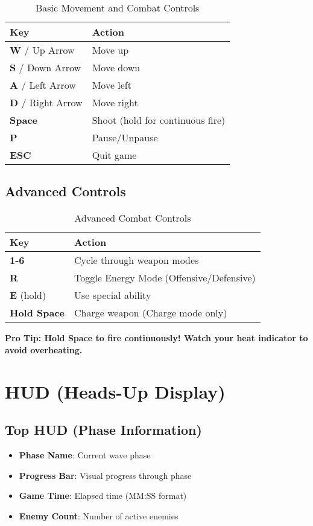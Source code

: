 \documentclass[11pt,a4paper]{article}
\newcommand{\infobox}[2]{%
    \vspace{0.3cm}
    \noindent\colorbox{#1!10}{%
        \parbox{\dimexpr\textwidth-2\fboxsep}{%
            \textcolor{#1}{\textbf{#2}}
        }
    }
    \vspace{0.3cm}
}
\begin{document}
\begin{table}[h]
\centering
\begin{tabularx}{\textwidth}{|l|X|}
\hline
\rowcolor{primarycolor!20}
\textbf{Key} & \textbf{Action} \\
\hline
\textbf{W} / Up Arrow & Move up \\
\hline
\textbf{S} / Down Arrow & Move down \\
\hline
\textbf{A} / Left Arrow & Move left \\
\hline
\textbf{D} / Right Arrow & Move right \\
\hline
\textbf{Space} & Shoot (hold for continuous fire) \\
\hline
\textbf{P} & Pause/Unpause \\
\hline
\textbf{ESC} & Quit game \\
\hline
\end{tabularx}
\caption{Basic Movement and Combat Controls}
\end{table}

\subsection{Advanced Controls}

\begin{table}[h]
\centering
\begin{tabularx}{\textwidth}{|l|X|}
\hline
\rowcolor{primarycolor!20}
\textbf{Key} & \textbf{Action} \\
\hline
\textbf{1-6} & Cycle through weapon modes \\
\hline
\textbf{R} & Toggle Energy Mode (Offensive/Defensive) \\
\hline
\textbf{E} (hold) & Use special ability \\
\hline
\textbf{Hold Space} & Charge weapon (Charge mode only) \\
\hline
\end{tabularx}
\caption{Advanced Combat Controls}
\end{table}

\infobox{infocolor}{\textbf{Pro Tip:} Hold Space to fire continuously! Watch your heat indicator to avoid overheating.}

\section{HUD (Heads-Up Display)}

\subsection{Top HUD (Phase Information)}
\begin{itemize}
    \item \textbf{Phase Name}: Current wave phase
    \item \textbf{Progress Bar}: Visual progress through phase
    \item \textbf{Game Time}: Elapsed time (MM:SS format)
    \item \textbf{Enemy Count}: Number of active enemies
\end{itemize}
\end{document}

